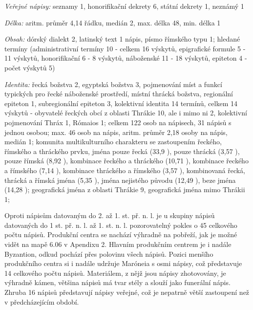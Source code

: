 {\em Veřejné nápisy:} seznamy 1, honorifikační dekrety 6, státní dekrety 1, neznámý 1

{\em Délka:} aritm. průměr 4,14 řádku, medián 2, max. délka 48, min. délka 1

{\em Obsah:} dórský dialekt 2, latinský text 1 nápis, písmo římského typu 1; hledané termíny (administrativní termíny 10 - celkem 16 výskytů, epigrafické formule 5 - 11 výskytů, honorifikační 6 - 8 výskytů, náboženské 11 - 18 výskytů, epiteton 4 - počet výskytů 5)

{\em Identita:} řecká božstva 2, egyptská božstva 3, pojmenování míst a funkcí typických pro řecké náboženské prostředí, místní thrácká božstva, regionální epiteton 1, subregionální epiteton 3, kolektivní identita 14 termínů, celkem 14 výskytů - obyvatelé řeckých obcí z oblasti Thrákie 10, ale i mimo ni 2, kolektivní pojmenování Thráx 1, Rómaios 1; celkem 122 osob na nápisech, 31 nápisů s jednou osobou; max. 46 osob na nápis, aritm. průměr 2,18 osoby na nápis, medián 1; komunita multikulturního charakteru se zastoupením řeckého, římského a thráckého prvku, jména pouze řecká (33,9 ), pouze thrácká (3,57 ), pouze římská (8,92 ), kombinace řeckého a thráckého (10,71 ), kombinace řeckého a římského (7,14 ), kombinace thráckého a římského (3,57 ), kombinovaná řecká, thrácká a římská jména (5,35 ), jména nejistého původu (12,49 ), beze jména (14,28 ); geografická jména z oblasti Thrákie 9, geografická jména mimo Thrákii 1;

\NC\AR
\HL
\HL
\stoptable

Oproti nápisům datovaným do 2. až 1. st. př. n. l. je u skupiny nápisů datovaných do 1 st. př. n. l. až 1. st. n. l. pozorovatelný pokles o 45  celkového počtu nápisů. Produkční centra se nachází výhradně na pobřeží, jak je možné vidět na mapě 6.06 v Apendixu 2. Hlavním produkčním centrem je i nadále Byzantion, odkud pochází přes polovinu všech nápisů. Pozici menšího produkčního centra si i nadále udržuje Maróneia s osmi nápisy, což představuje 14  celkového počtu nápisů. Materiálem, z nějž jsou nápisy zhotovovány, je výhradně kámen, většina nápisů má tvar stély a slouží jako funerální nápis. Zhruba 16  nápisů představují nápisy veřejné, což je nepatrně větší zastoupení než v předcházejícím období.

